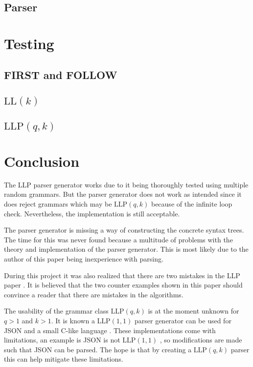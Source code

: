\documentclass[a4paper,12pt]{article}
\newcommand\LL{\text{LL}}
\newcommand\LLP{\text{LLP}}
\theoremstyle{definition}
\begin{document}
\subsection{Parser}


\section{Testing}
\subsection{FIRST and FOLLOW}


\subsection{\texorpdfstring{$\LL(k)$}{TEXT}}


\subsection{\texorpdfstring{$\LLP(q,k)$}{TEXT}}


\newpage
\section{Conclusion}
The LLP parser generator works due to it being thoroughly tested using multiple random grammars. But the parser generator does not work as intended since it does reject grammars which may be $\LLP(q,k)$ because of the infinite loop check. Nevertheless, the implementation is still acceptable.

The parser generator is missing a way of constructing the concrete syntax trees. The time for this was never found because a multitude of problems with the theory and implementation of the parser generator. This is most likely due to the author of this paper being inexperience with parsing.

During this project it was also realized that there are two mistakes in the LLP paper \cite{Vagner2007}. It is believed that the two counter examples shown in this paper should convince a reader that there are mistakes in the algorithms.

The usability of the grammar class $\LLP(q, k)$ is at the moment unknown for $q > 1$ and $k > 1$. It is known a $\LLP(1, 1)$ parser generator can be used for JSON and a small C-like language \cite{voetter2021}. These implementations come with limitations, an example is JSON is not $\LLP(1, 1)$ \cite[60]{voetter2021}, so modifications are made such that JSON can be parsed. The hope is that by creating a $\LLP(q, k)$ parser this can help mitigate these limitations.

\printbibliography
% 
\end{document}
